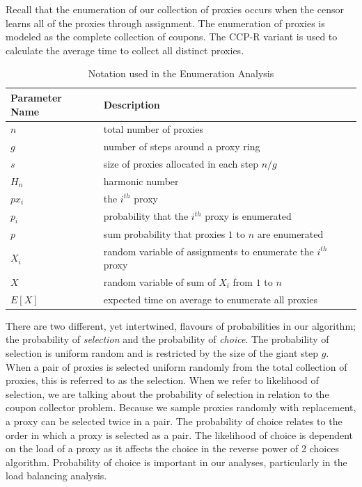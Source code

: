 Recall that the enumeration of our collection of proxies occurs when the censor learns all of the proxies through assignment. The enumeration of proxies is modeled as the complete collection of coupons. The \ac{CCP-R} variant is used to calculate the average time to collect all distinct proxies.
 

\begin{table}[h]
  \centering
	\begin{tabular}{ll}
	\hline
	\cline{1-2}
	Parameter Name    & Description  \\
	\hline
    $n$     & total number of proxies \\
	$g$     & number of steps around a proxy ring  \\
	$s$     & size of proxies allocated in each step $n/g$ \\
    $H_n$   & harmonic number \\
    $px_i$  & the $i^{th}$ proxy \\
    $p_i$   & probability that the $i^{th}$ proxy is enumerated \\
    $p$     & sum probability that proxies $1$ to $n$ are enumerated \\
    $X_i$   & random variable of assignments to enumerate the $i^{th}$ proxy \\
    $X$     & random variable of sum of $X_i$ from $1$ to $n$ \\
    $E[X]$  & expected time on average to enumerate all proxies \\
	\hline
	\end{tabular}
  \caption{Notation used in the Enumeration Analysis}
  \label{tab:vars}
\end{table}

There are two different, yet intertwined, flavours of probabilities in our algorithm; the probability of \textit{selection} and the probability of \textit{choice}. The probability of selection is uniform random and is restricted by the size of the giant step $g$. When a pair of proxies is selected uniform randomly from the total collection of proxies, this is referred to as the selection. When we refer to likelihood of selection, we are talking about the probability of selection in relation to the coupon collector problem. Because we sample proxies randomly with replacement, a proxy can be selected twice in a pair. The probability of choice relates to the order in which a proxy is selected as a pair. The likelihood of choice is dependent on the load of a proxy as it affects the choice in the reverse power of 2 choices algorithm. Probability of choice is important in our analyses, particularly in the load balancing analysis.

